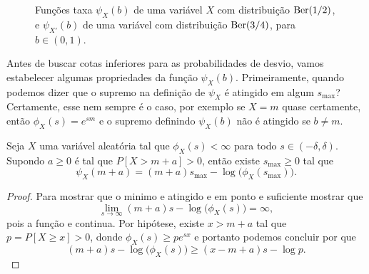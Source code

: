 \begin{figure}[!ht]
  \centering
  \caption{Funções taxa $\psi_{X}(b)$ de uma variável $X$ com distribuição $\operatorname{Ber}(1/2)$, e $\psi_{X'}(b)$ de uma variável com distribuição $\operatorname{Ber}(3/4)$, para $b \in (0,1)$.}
\end{figure}

Antes de buscar cotas inferiores para as probabilidades de desvio, vamos estabelecer algumas propriedades da função $\psi_X(b)$.
Primeiramente, quando podemos dizer que o supremo na definição de $\psi_X$ é atingido em algum $s_{\text{max}}$?
Certamente, esse nem sempre é o caso, por exemplo se $X = m$ quase certamente, então $\phi_X(s) = e^{sm}$ e o supremo definindo $\psi_X(b)$ não é atingido se $b \neq m$.

\begin{lemma}
  \label{l:smax_PGD}
  Seja $X$ uma variável aleatória tal que $\phi_X(s) < \infty$ para todo $s \in (-\delta, \delta)$.
  Supondo $a \geq 0$ é tal que $P[X > m + a] > 0$, então existe $s_{\text{max}} \geq 0$ tal que
  \begin{equation}
    \psi_X(m + a) = (m + a)s_{\text{max}} - \log\big(\phi_X(s_\text{max})\big).
  \end{equation}
\end{lemma}

\begin{proof}
Para mostrar que o minimo e atingido e em ponto e suficiente mostrar que 
$$ \lim_{s\to \infty} (m + a)s - \log\big(\phi_X(s)\big)=\infty,$$
pois a função e continua.
Por hipótese, existe $x > m + a$ tal que $p = P[X \geq x] > 0$, donde $\phi_X(s) \geq p e^{sx}$ e portanto podemos concluir por que
$$(m + a)s - \log\big(\phi_X(s)\big)\ge (x-m+a)s -\log p.$$

\end{proof}

